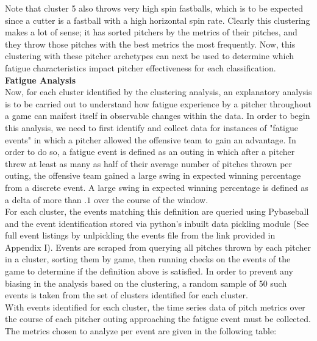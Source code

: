 \documentclass[12 pt]{article}
\begin{document}
Note that cluster 5 also throws very high spin fastballs, which 
is to be expected since a cutter is a fastball with a high horizontal spin rate. Clearly this 
clustering makes a lot of sense; it has sorted pitchers by the metrics of their pitches, and 
they throw those pitches with the best metrics the most frequently. Now, this clustering with 
these pitcher archetypes can next be used to determine which fatigue characteristics impact 
pitcher effectiveness for each classification. \\


\textbf{Fatigue Analysis} \\
\indent Now, for each cluster identified by the clustering analysis, an explanatory analysis 
is to be carried out to understand how fatigue experience by a pitcher throughout a 
game can maifest itself in observable changes within the data. In order to begin this analysis, 
we need to first identify and collect data for instances of "fatigue events" in which 
a pitcher allowed the offensive team to gain an advantage. In order to do so, a fatigue event 
is defined as an outing in which after a pitcher threw at least as many as half of their average number of pitches
thrown per outing, the offensive team gained a large swing in expected winning percentage from a discrete event. A large swing in expected winning 
percentage is defined as a delta of more than $.1$ over the course of the window. 
\\ \indent For each cluster, the events matching this definition are queried using Pybaseball 
and the event identification stored via python's inbuilt data pickling module (See full event listings 
by unlpickling the events file from the link provided in Appendix I). Events are scraped from 
querying all pitches thrown by each pitcher in a cluster, sorting them by game, then running checks 
on the events of the game to determine if the definition above is satisfied. In order to prevent any biasing in the 
analysis based on the clustering, a random sample of 50 such events is taken from the set of 
clusters identified for each cluster.
\\ \indent With events identified for each cluster, the time series data of pitch metrics 
over the course of each pitcher outing approaching the fatigue event must be collected. The metrics chosen 
to analyze per event are given in the following table:
\end{document}
